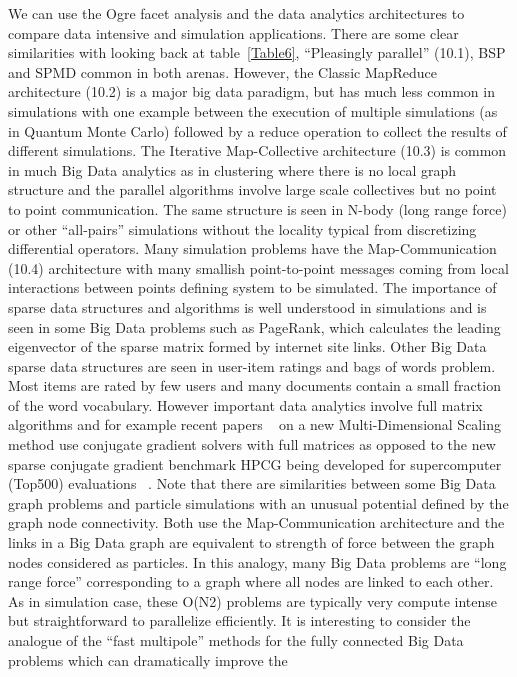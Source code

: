 \documentclass{acm_proc_article-sp}
\begin{document}
We can use the Ogre facet analysis and the data analytics architectures to
compare data intensive and simulation applications. There are some clear
similarities with looking back at table~\ref{Table6}, ``Pleasingly parallel''
(10.1), BSP and SPMD common in both arenas. However, the Classic MapReduce
architecture (10.2) is a major big data paradigm, but has much less common in
simulations with one example between the execution of multiple simulations (as
in Quantum Monte Carlo) followed by a reduce operation to collect the results
of different simulations. The Iterative Map-Collective architecture (10.3) is
common in much Big Data analytics as in clustering where there is no local
graph structure and the parallel algorithms involve large scale collectives but
no point to point communication. The same structure is seen in N-body (long
range force) or other ``all-pairs'' simulations without the locality typical
from discretizing differential operators. Many simulation problems have the
Map-Communication (10.4) architecture with many smallish point-to-point
messages coming from local interactions between points defining system to be
simulated. The importance of sparse data structures and algorithms is well
understood in simulations and is seen in some Big Data problems such as
PageRank, which calculates the leading eigenvector of the sparse matrix formed
by internet site links. Other Big Data sparse data structures are seen in
user-item ratings and bags of words problem. Most items are rated by few users
and many documents contain a small fraction of the word vocabulary. However
important data analytics involve full matrix algorithms and for example recent
papers ~\cite{b31,b32} on a new Multi-Dimensional Scaling method use conjugate
gradient solvers with full matrices as opposed to the new sparse conjugate
gradient benchmark HPCG being developed for supercomputer (Top500) evaluations
~\cite{b17}. Note that there are similarities between some Big Data graph
problems and particle simulations with an unusual potential defined by the
graph node connectivity. Both use the Map-Communication architecture and the
links in a Big Data graph are equivalent to strength of force between the graph
nodes considered as particles. In this analogy, many Big Data problems are
``long range force'' corresponding to a graph where all nodes are linked to
each other. As in simulation case, these O(N2) problems are typically very
compute intense but straightforward to parallelize efficiently. It is
interesting to consider the analogue of the ``fast multipole'' methods for the
fully connected Big Data problems which can dramatically improve the
\end{document}

